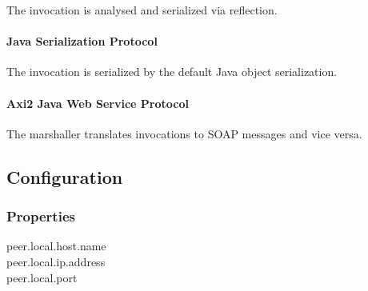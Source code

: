 The invocation is analysed and serialized via reflection.

\paragraph{Java Serialization Protocol}

The invocation is serialized by the default Java object serialization.

\paragraph{Axi2 Java Web Service Protocol}

The marshaller translates invocations to SOAP messages and vice versa.

\subsection{Configuration}

\subsubsection{Properties}

peer.local.host.name\\
peer.local.ip.address\\
peer.local.port\\
